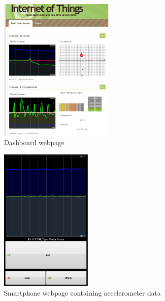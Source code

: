 \documentclass[pdftex,10pt,a4paper]{report}
\begin{document}
\begin{figure}[h!]
		\centering
		\includegraphics[width=0.5\textwidth]{./dashboard_acc_env.jpg}
		\caption{Dashboard webpage}
		\label{Dashboard webpage}
\end{figure}

\begin{figure}[h!]
		\centering
		\includegraphics[width=0.4\textwidth]{./mobile_web_acc.jpg}
		\caption{Smartphone webpage containing accelerometer data}
		\label{Smartphone webpage containing accelerometer data}
\end{figure}
\end{document}
